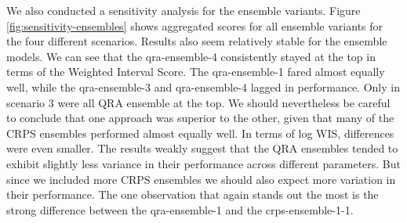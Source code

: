 \documentclass[
]{book}
\begin{document}
We also conducted a sensitivity analysis for the ensemble variants. Figure \ref{fig:sensitivity-ensembles} shows aggregated scores for all ensemble variants for the four different scenarios. Results also seem relatively stable for the ensemble models. We can see that the qra-ensemble-4 consistently stayed at the top in terms of the Weighted Interval Score. The qra-ensemble-1 fared almost equally well, while the qra-ensemble-3 and qra-ensemble-4 lagged in performance. Only in scenario 3 were all QRA ensemble at the top. We should nevertheless be careful to conclude that one approach was superior to the other, given that many of the CRPS ensembles performed almost equally well. In terms of log WIS, differences were even smaller. The results weakly suggest that the QRA ensembles tended to exhibit slightly less variance in their performance across different parameters. But since we included more CRPS ensembles we should also expect more variation in their performance. The one observation that again stands out the most is the strong difference between the qra-ensemble-1 and the crps-ensemble-1-1.
\end{document}
